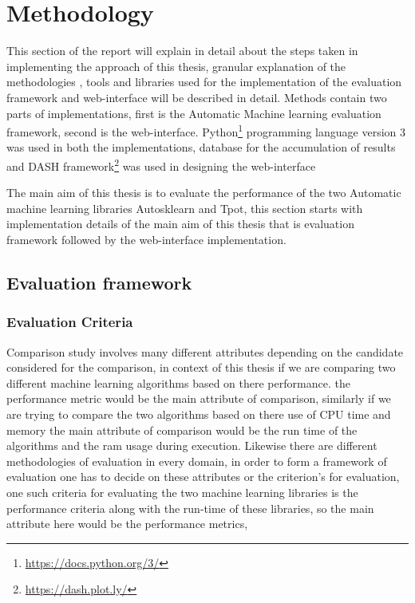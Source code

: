\chapter{Methodology}\label{chap:methods}

This section of the report will explain in detail about the steps taken in implementing the approach of this thesis, granular explanation of the methodologies , tools and libraries used for the implementation of the evaluation framework and web-interface will be described in detail. Methods contain two parts of  implementations, first is the Automatic Machine learning evaluation framework, second is the web-interface. Python\footnote{\url{https://docs.python.org/3/}} programming language version 3 was used in  both the implementations, database for the accumulation of results and DASH framework\footnote{\url{https://dash.plot.ly/}} was used in designing the web-interface

The main aim of this thesis is to evaluate the performance of the two Automatic machine learning libraries Autosklearn and Tpot, this section starts with implementation details of the main aim of this thesis that is evaluation framework followed by the web-interface implementation.

\section{Evaluation framework}

\subsection{Evaluation Criteria}
Comparison study involves many different attributes depending on the candidate considered for the comparison, in context of this thesis if we are comparing two different machine learning algorithms based on there performance. the performance metric would be the main attribute of comparison, similarly if we are trying to compare the two algorithms based on there use of CPU time and memory the main attribute of comparison would be the run time of the algorithms and the ram usage during execution. Likewise there are different methodologies of evaluation in every domain, in order to form a framework of evaluation one has to decide on these attributes or the criterion's for evaluation, one such criteria for evaluating the two machine learning libraries is the performance criteria along with the run-time of these libraries, so the main attribute here would be the performance metrics, 


